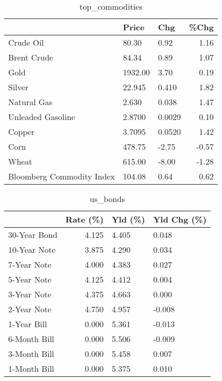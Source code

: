 \documentclass{article}%
\begin{document}
\begin{table}[htbp]%
\caption{top\_commodities}%
\centering%
\begin{adjustbox}{width=1\textwidth}%
\begin{tabular}{lllr}
\toprule
                          &   Price &    Chg &  \%Chg \\
\midrule
               Crude Oil  &   80.30 &   0.92 &  1.16 \\
             Brent Crude  &   84.34 &   0.89 &  1.07 \\
                    Gold  & 1932.00 &   3.70 &  0.19 \\
                  Silver  &  22.945 &  0.410 &  1.82 \\
             Natural Gas  &   2.630 &  0.038 &  1.47 \\
       Unleaded Gasoline  &  2.8700 & 0.0029 &  0.10 \\
                  Copper  &  3.7095 & 0.0520 &  1.42 \\
                    Corn  &  478.75 &  -2.75 & -0.57 \\
                   Wheat  &  615.00 &  -8.00 & -1.28 \\
Bloomberg Commodity Index &  104.08 &   0.64 &  0.62 \\
\bottomrule
\end{tabular}
%
\end{adjustbox}%
\end{table}

%


\begin{table}[htbp]%
\caption{us\_bonds}%
\centering%
\begin{adjustbox}{width=1\textwidth}%
\begin{tabular}{lrll}
\toprule
             &  Rate (\%) & Yld (\%) & Yld Chg (\%) \\
\midrule
30-Year Bond &     4.125 &   4.405 &       0.048 \\
10-Year Note &     3.875 &   4.290 &       0.034 \\
 7-Year Note &     4.000 &   4.383 &       0.027 \\
 5-Year Note &     4.125 &   4.412 &       0.004 \\
 3-Year Note &     4.375 &   4.663 &       0.000 \\
 2-Year Note &     4.750 &   4.957 &      -0.008 \\
 1-Year Bill &     0.000 &   5.361 &      -0.013 \\
6-Month Bill &     0.000 &   5.506 &      -0.009 \\
3-Month Bill &     0.000 &   5.458 &       0.007 \\
1-Month Bill &     0.000 &   5.375 &       0.010 \\
\bottomrule
\end{tabular}
%
\end{adjustbox}%
\end{table}
\end{document}
